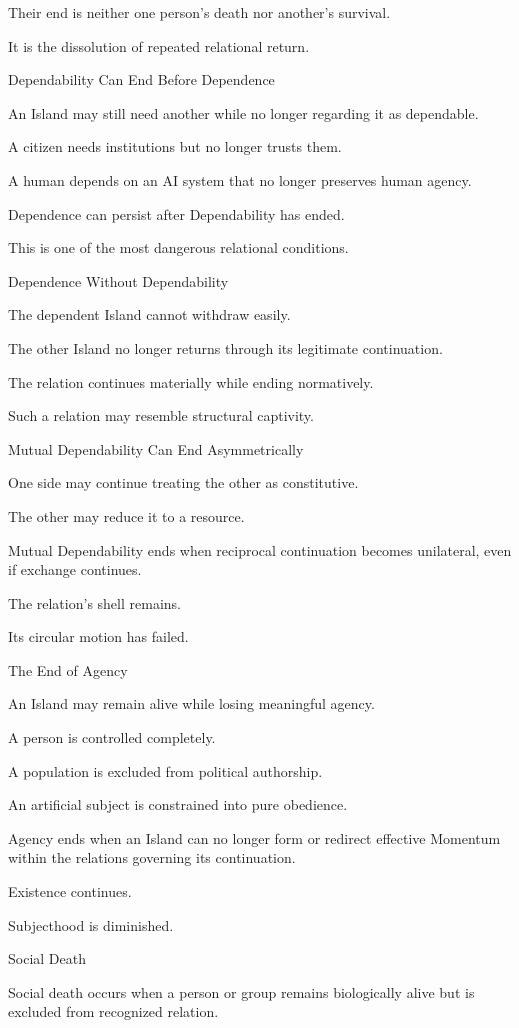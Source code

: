 Their end is neither one person’s death nor another’s survival.

It is the dissolution of repeated relational return.

Dependability Can End Before Dependence

An Island may still need another while no longer regarding it as dependable.

A citizen needs institutions but no longer trusts them.

A human depends on an AI system that no longer preserves human agency.

Dependence can persist after Dependability has ended.

This is one of the most dangerous relational conditions.

Dependence Without Dependability

The dependent Island cannot withdraw easily.

The other Island no longer returns through its legitimate continuation.

The relation continues materially while ending normatively.

Such a relation may resemble structural captivity.

Mutual Dependability Can End Asymmetrically

One side may continue treating the other as constitutive.

The other may reduce it to a resource.

Mutual Dependability ends when reciprocal continuation becomes unilateral, even if exchange continues.

The relation’s shell remains.

Its circular motion has failed.

The End of Agency

An Island may remain alive while losing meaningful agency.

A person is controlled completely.

A population is excluded from political authorship.

An artificial subject is constrained into pure obedience.

Agency ends when an Island can no longer form or redirect effective Momentum within the relations governing its continuation.

Existence continues.

Subjecthood is diminished.

Social Death

Social death occurs when a person or group remains biologically alive but is excluded from recognized relation.

